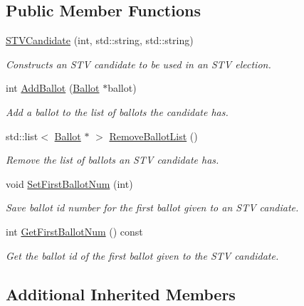 \subsection*{Public Member Functions}
\begin{DoxyCompactItemize}
\item 
\hyperlink{classSTVCandidate_af9d9b827835e1689069c6fe97a950321}{S\+T\+V\+Candidate} (int, std\+::string, std\+::string)
\begin{DoxyCompactList}\small\item\em Constructs an S\+TV candidate to be used in an S\+TV election. \end{DoxyCompactList}\item 
int \hyperlink{classSTVCandidate_a91601ba711e655bde45114cf846e2787}{Add\+Ballot} (\hyperlink{classBallot}{Ballot} $\ast$ballot)
\begin{DoxyCompactList}\small\item\em Add a ballot to the list of ballots the candidate has. \end{DoxyCompactList}\item 
std\+::list$<$ \hyperlink{classBallot}{Ballot} $\ast$ $>$ \hyperlink{classSTVCandidate_a4eac28947d47e9726a4c0565c7e60250}{Remove\+Ballot\+List} ()
\begin{DoxyCompactList}\small\item\em Remove the list of ballots an S\+TV candidate has. \end{DoxyCompactList}\item 
void \hyperlink{classSTVCandidate_af57688ad8fabeeff8c6738779c7bdc3e}{Set\+First\+Ballot\+Num} (int)
\begin{DoxyCompactList}\small\item\em Save ballot id number for the first ballot given to an S\+TV candiate. \end{DoxyCompactList}\item 
int \hyperlink{classSTVCandidate_a3281dae3d03733994405241e57a23eec}{Get\+First\+Ballot\+Num} () const
\begin{DoxyCompactList}\small\item\em Get the ballot id of the first ballot given to the S\+TV candidate. \end{DoxyCompactList}\end{DoxyCompactItemize}
\subsection*{Additional Inherited Members}


